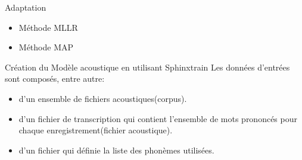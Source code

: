 \begin{frame}{Adaptation}
\begin{itemize}
\item Méthode MLLR
\item Méthode MAP
\end{itemize}

\end{frame}

\begin{frame}{Création du Modèle acoustique en utilisant Sphinxtrain}
Les données d'entrées sont composés, entre autre:
\begin{itemize}
\item d'un ensemble de fichiers acoustiques(corpus).
\item d'un fichier de transcription qui contient l'ensemble de mots prononcés pour chaque enregistrement(fichier acoustique).
\item d'un fichier qui définie la liste des phonèmes utilisées.
\end{itemize}
\end{frame}